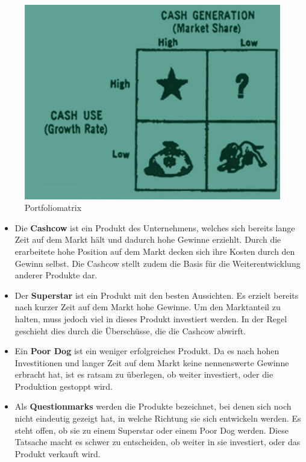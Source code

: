     \begin{figure}[H]
      \begin{centering}
      \includegraphics[width = 1\textwidth]{Bilder/portfoliomatrix.jpg}
      \par\end{centering}
      \caption[Portfoliomatrix]{Portfoliomatrix\cite{pic_matrix}}
      \label{matrix}
    \end{figure}

    \begin{itemize}
      \item Die \textbf{Cashcow} ist ein Produkt des Unternehmens, welches sich bereits lange Zeit auf dem Markt hält und dadurch hohe Gewinne erziehlt. Durch die
      erarbeitete hohe Position auf dem Markt decken sich ihre Kosten durch den Gewinn selbst. Die Cashcow stellt zudem die Basis für die Weiterentwicklung anderer
      Produkte dar.

      \item Der \textbf{Superstar} ist ein Produkt mit den besten Aussichten. Es erzielt bereits nach kurzer Zeit auf dem Markt hohe Gewinne. Um den Marktanteil
      zu halten, muss jedoch viel in dieses Produkt investiert werden. In der Regel geschieht dies durch die Überschüsse, die die Cashcow abwirft.

      \item Ein \textbf{Poor Dog} ist ein weniger erfolgreiches Produkt. Da es nach hohen Investitionen und langer Zeit auf dem Markt keine nennenswerte
      Gewinne erbracht hat, ist es ratsam zu überlegen, ob weiter investiert, oder die Produktion gestoppt wird.

      \item Als \textbf{Questionmarks} werden die Produkte bezeichnet, bei denen sich noch nicht eindeutig gezeigt hat, in welche Richtung sie sich entwickeln werden.
      Es steht offen, ob sie zu einem Superstar oder einem Poor Dog werden. Diese Tatsache macht es schwer zu entscheiden, ob weiter in sie investiert, oder das Produkt
      verkauft wird.
    \end{itemize}

